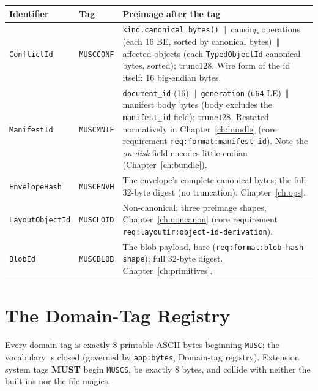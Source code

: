 \documentclass[11pt,letterpaper]{report}
\newcommand{\sectionsc}[1]{{\addfontfeatures{Letters=SmallCaps}#1}}
\newcounter{requirement}[chapter]
\newcommand{\MUST}{\textbf{MUST}}
\newcommand{\cat}{\ensuremath{\,\Vert\,}}
\begin{document}
\begingroup\small
\begin{longtable}{p{1.1in} p{0.75in} p{3.7in}}
  \toprule
  \textbf{Identifier} & \textbf{Tag} & \textbf{Preimage after the tag} \\
  \midrule
  \endhead
  \texttt{ConflictId} & \texttt{MUSCCONF} &
    \texttt{kind.canonical\_bytes()} \cat{} causing operations (each 16 BE,
    sorted by canonical bytes) \cat{} affected objects (each
    \texttt{TypedObjectId} canonical bytes, sorted); $\mathrm{trunc128}$.
    Wire form of the id itself: 16 big-endian bytes. \\
  \texttt{ManifestId} & \texttt{MUSCMNIF} &
    \texttt{document\_id} (16) \cat{} \texttt{generation} (\texttt{u64} LE)
    \cat{} manifest body bytes (body excludes the \texttt{manifest\_id}
    field); $\mathrm{trunc128}$. Restated normatively in
    Chapter~\ref{ch:bundle} (core requirement
    \texttt{req:format:manifest-id}). Note the \emph{on-disk} field encodes
    little-endian (Chapter~\ref{ch:bundle}). \\
  \texttt{EnvelopeHash} & \texttt{MUSCENVH} &
    The envelope's complete canonical bytes; the full 32-byte digest (no
    truncation). Chapter~\ref{ch:ops}. \\
  \texttt{LayoutObjectId} & \texttt{MUSCLOID} &
    Non-canonical; three preimage shapes, Chapter~\ref{ch:noncanon}
    (core requirement \texttt{req:layoutir:object-id-derivation}). \\
  \texttt{BlobId} & \texttt{MUSCBLOB} &
    The blob payload, bare (\texttt{req:format:blob-hash-shape}); full
    32-byte digest. Chapter~\ref{ch:primitives}. \\
  \bottomrule
\end{longtable}
\endgroup

\section{The Domain-Tag Registry}
\label{sec:ids:tags}

Every domain tag is exactly 8 printable-ASCII bytes beginning \texttt{MUSC};
the vocabulary is closed (governed by \texttt{app:bytes},
\sectionsc{Domain-tag registry}). Extension system tags \MUST{} begin
\texttt{MUSCS}, be exactly 8 bytes, and collide with neither the built-ins
nor the file magics.
\end{document}
